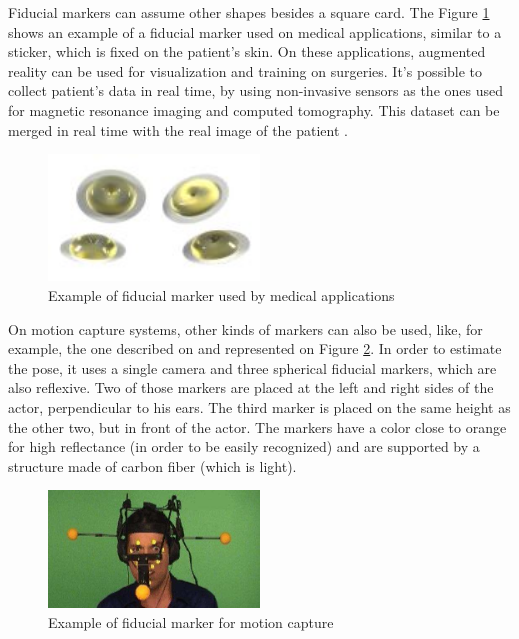 \documentclass[msc, a4paper, classic, en]{ufbathesis}
\begin{document}
Fiducial markers can assume other shapes besides a square card. The Figure \ref{fig:sticker} shows an example of a fiducial marker used on medical applications, similar to a sticker, which is fixed on the patient's skin. On these applications, augmented reality can be used for visualization and training on surgeries. It's possible to collect patient's data in real time, by using non-invasive sensors as the ones used for magnetic resonance imaging and computed tomography. This dataset can be merged in real time with the real image of the patient \cite{azuma}.

\begin{figure}
\centering
\includegraphics[width=0.5\textwidth]{images/sticker.png}
\caption{Example of fiducial marker used by medical applications}
\label{fig:sticker}
\end{figure}

On motion capture systems, other kinds of markers can also be used, like, for example, the one described on \cite{4526681} and represented on Figure \ref{fig:helmet}. In order to estimate the pose, it uses a single camera and three spherical fiducial markers, which are also reflexive. Two of those markers are placed at the left and right sides of the actor, perpendicular to his ears. The third marker is placed on the same height as the other two, but in front of the actor. The markers have a color close to orange for high reflectance (in order to be easily recognized) and are supported by a structure made of carbon fiber (which is light).

\begin{figure}
\centering
\includegraphics[width=0.5\textwidth]{images/helmet.png}
\caption{Example of fiducial marker for motion capture}
\label{fig:helmet}
\end{figure}
\end{document}
